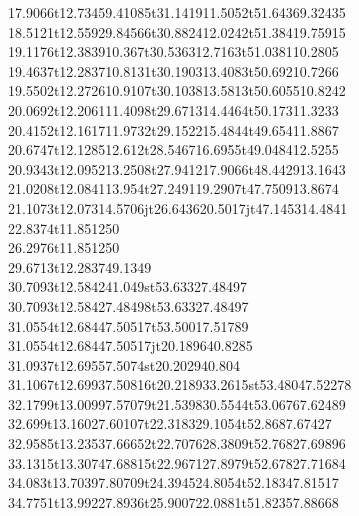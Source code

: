 \documentclass[draft]{article}
\begin{document}
{{17.9066}t{12.7345}{9.41085}t{31.1419}{11.5052}t{51.6436}{9.32435}\\%
{18.5121}t{12.5592}{9.84566}t{30.8824}{12.0242}t{51.3841}{9.75915}\\%
{19.1176}t{12.3839}{10.367}t{30.5363}{12.7163}t{51.0381}{10.2805}\\%
{19.4637}t{12.2837}{10.8131}t{30.1903}{13.4083}t{50.692}{10.7266}\\%
{19.5502}t{12.2726}{10.9107}t{30.1038}{13.5813}t{50.6055}{10.8242}\\%
{20.0692}t{12.2061}{11.4098}t{29.6713}{14.4464}t{50.173}{11.3233}\\%
{20.4152}t{12.1617}{11.9732}t{29.1522}{15.4844}t{49.654}{11.8867}\\%
{20.6747}t{12.1285}{12.612}t{28.5467}{16.6955}t{49.0484}{12.5255}\\%
{20.9343}t{12.0952}{13.2508}t{27.9412}{17.9066}t{48.4429}{13.1643}\\%
{21.0208}t{12.0841}{13.954}t{27.2491}{19.2907}t{47.7509}{13.8674}\\%
{21.1073}t{12.073}{14.5706}jt{26.6436}{20.5017}jt{47.1453}{14.4841}\\%
{22.8374}t{11.8512}{50}\\%
{26.2976}t{11.8512}{50}\\%
{29.6713}t{12.2837}{49.1349}\\%
{30.7093}t{12.5842}{41.049}st{53.6332}{7.48497}\\%
{30.7093}t{12.5842}{7.48498}t{53.6332}{7.48497}\\%
{31.0554}t{12.6844}{7.50517}t{53.5001}{7.51789}\\%
{31.0554}t{12.6844}{7.50517}jt{20.1896}{40.8285}\\%
{31.0937}t{12.6955}{7.5074}st{20.2029}{40.804}\\%
{31.1067}t{12.6993}{7.50816}t{20.2189}{33.2615}st{53.4804}{7.52278}\\%
{32.1799}t{13.0099}{7.57079}t{21.5398}{30.5544}t{53.0676}{7.62489}\\%
{32.699}t{13.1602}{7.60107}t{22.3183}{29.1054}t{52.868}{7.67427}\\%
{32.9585}t{13.2353}{7.66652}t{22.7076}{28.3809}t{52.7682}{7.69896}\\%
{33.1315}t{13.3074}{7.68815}t{22.9671}{27.8979}t{52.6782}{7.71684}\\%
{34.083}t{13.7039}{7.80709}t{24.3945}{24.8054}t{52.1834}{7.81517}\\%
{34.7751}t{13.9922}{7.8936}t{25.9007}{22.0881}t{51.8235}{7.88668}\\%
}
\end{document}
